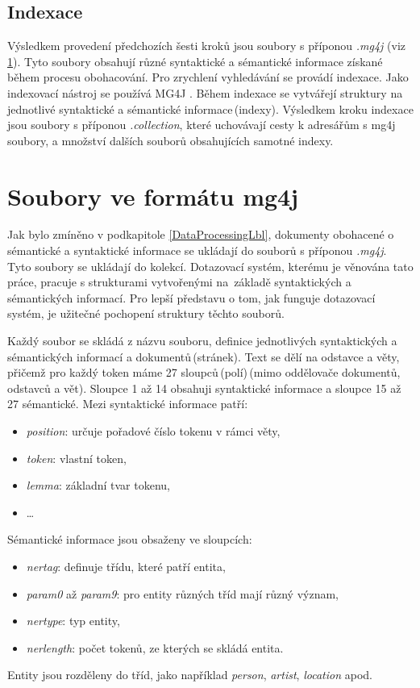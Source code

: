 \subsection*{Indexace}
Výsledkem provedení předchozích šesti kroků jsou soubory s příponou \emph{.mg4j} (viz \ref{MG4JFilesLbl}). Tyto soubory obsahují různé syntaktické a sémantické informace získané během procesu obohacování. Pro zrychlení vyhledávání se provádí indexace. Jako indexovací nástroj se používá MG4J \cite{BoVTREC2005}. Během indexace se vytvářejí struktury na jednotlivé syntaktické a sémantické informace\,(indexy). Výsledkem kroku indexace jsou soubory s příponou \emph{.collection}, které uchovávají cesty k adresářům s mg4j soubory, a množství dalších souborů obsahujících samotné indexy.


\section{Soubory ve formátu mg4j}
\label{MG4JFilesLbl}
Jak bylo zmíněno v podkapitole \ref{DataProcessingLbl}, dokumenty obohacené o sémantické a syntaktické informace se ukládají do souborů s příponou \emph{.mg4j}. Tyto soubory se ukládají do kolekcí. Dotazovací systém, kterému je věnována tato práce, pracuje s strukturami vytvořenými na~základě syntaktických a sémantických  informací. Pro lepší představu o tom, jak funguje dotazovací systém, je užitečné pochopení struktury těchto souborů.

Každý soubor se skládá z názvu souboru, definice jednotlivých syntaktických a sémantických informací a dokumentů\,(stránek). Text se dělí na odstavce a věty, přičemž pro každý token máme 27 sloupců\,(polí)\,(mimo oddělovače dokumentů, odstavců a vět). Sloupce 1 až 14 obsahuji syntaktické informace a sloupce 15 až 27 sémantické. Mezi  syntaktické informace patří:
\begin{itemize}
\item \emph{position}: určuje pořadové číslo tokenu v rámci věty,

\item \emph{token}: vlastní token,

\item \emph{lemma}: základní tvar tokenu,

\item \ldots
\end{itemize} 
Sémantické informace jsou obsaženy ve sloupcích:

\begin{itemize}
\item \emph{nertag}: definuje třídu, které patří entita,

\item \emph{param0} až \emph{param9}: pro entity různých tříd mají různý význam,

\item \emph{nertype}: typ entity,

\item \emph{nerlength}: počet tokenů, ze kterých se skládá entita.
\end{itemize}
Entity jsou rozděleny do tříd, jako například \emph{person}, \emph{artist}, \emph{location} apod.

